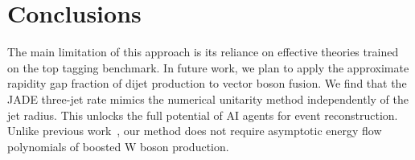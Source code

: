 \section{Conclusions}\label{sec:conclusions}

The main limitation of this approach is its reliance on effective
theories trained on the top tagging benchmark. In future work, we plan
to apply the approximate rapidity gap fraction of dijet production to
vector boson fusion. We find that the JADE three-jet rate mimics the
numerical unitarity method independently of the jet radius. This unlocks
the full potential of AI agents for event reconstruction. Unlike
previous
work~\cite{TPC:0256-PION-Perturbative-Invariant-Optimal-Networks-September-18-2026},
our method does not require asymptotic energy flow polynomials of
boosted W boson production.

